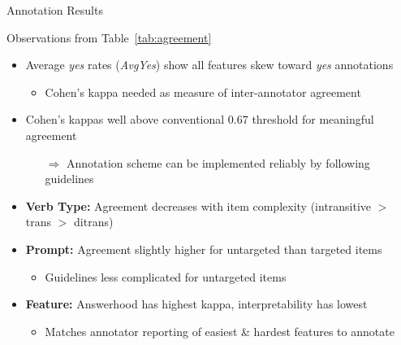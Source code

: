 \documentclass[final,14pt,t]{beamer}
\begin{document}
\begin{frame}{}
\begin{columns}[t]
\begin{column}{.33\linewidth}
\begin{minipage}[t][\textheight]{\linewidth}
\begin{block}{Annotation Results}
\begin{center}
\begin{minipage}{.85\textwidth}
\begin{center}
  Observations from Table~\ref{tab:agreement}
\end{center}
\begin{itemize}
	\vspace{.2em}
	\item Average \textit{yes} rates (\textit{AvgYes}) show all features skew toward \textit{yes} annotations
          \begin{itemize}
          \vspace{.2em}
          \item Cohen's kappa needed as measure of inter-annotator agreement
          \end{itemize}
	\vspace{.5em}
	\item Cohen's kappas well above conventional 0.67 threshold for meaningful agreement
          \begin{itemize}
          \vspace{.2em}
          \item[$\Rightarrow$] Annotation scheme can be implemented reliably by following guidelines
          \end{itemize}
	\vspace{.5em}
	\item \textbf{Verb Type:} Agreement decreases with item complexity (intransitive $>$ trans $>$ ditrans)
	\vspace{.5em}
	\item \textbf{Prompt:} Agreement slightly higher for untargeted than targeted items
          \begin{itemize}
          \vspace{.2em}
          \item Guidelines less complicated for untargeted items
          \end{itemize}
	\vspace{.5em}
	\item \textbf{Feature:} Answerhood has highest kappa, interpretability has lowest
          \begin{itemize}
          \vspace{.2em}
          \item Matches annotator reporting of easiest \& hardest features to annotate
          \end{itemize}
\end{itemize}
\vspace{1.3em}
\end{minipage}
\end{center}
\end{block}




\end{minipage}
\end{column}
\end{columns}
\end{frame}
\end{document}
